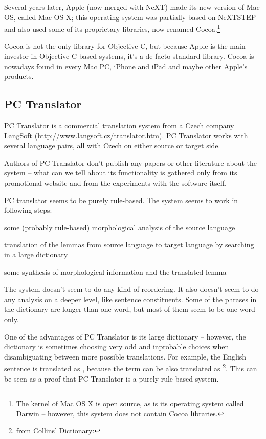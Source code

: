 Several years later, Apple (now merged with NeXT) made its new version of Mac OS, called Mac OS X; this operating system was partially based on NeXTSTEP and also used some of its proprietary libraries, now renamed Cocoa.\footnote{The kernel of Mac OS X is open source, as is its  operating system called Darwin -- however, this system does not contain Cocoa libraries.}

Cocoa is not the only library for Objective-C, but because Apple is the main investor in Objective-C-based systems, it's a de-facto standard library. Cocoa is nowadays found in every Mac PC, iPhone and iPad and maybe other Apple's products.

\subsection{PC Translator}
\label{langsoft}

PC Translator is a commercial translation system from a Czech company LangSoft (\url{http://www.langsoft.cz/translator.htm}). PC Translator works with several language pairs, all with Czech on either source or target side.

Authors of PC Translator don't publish any papers or other literature about the system -- what can we tell about its functionality is gathered only from its promotional website and from the experiments with the software itself.

PC translator seems to be purely rule-based. The system seems to work in following steps:

\begin{pitemize}
\item some (probably rule-based) morphological analysis of the source language
\item translation of the lemmas from source language to target language by searching in a large dictionary
\item some synthesis of morphological information and the translated lemma
\end{pitemize}

The system doesn't seem to do any kind of reordering. It also doesn't seem to do any analysis on a deeper level, like sentence constituents. Some of the phrases in the dictionary are longer than one word, but most of them seem to be one-word only.

One of the advantages of PC Translator is its large dictionary -- however, the dictionary is sometimes choosing very odd and inprobable choices when disambiguating between more possible translations. For example, the English sentence  is translated as , because the term  can be also translated as \footnote{from Collins' Dictionary: }. This can be seen as a proof that PC Translator is a purely rule-based system.

